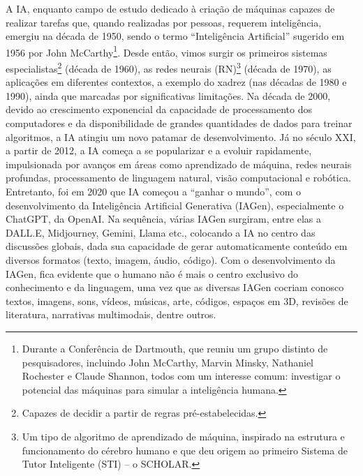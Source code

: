 \documentclass[portuguese]{textolivre}
\begin{document}
A IA, enquanto campo de estudo dedicado à criação de máquinas capazes de realizar tarefas que, quando realizadas por pessoas, requerem inteligência, emergiu na década de 1950, sendo o termo “Inteligência Artificial” sugerido em 1956 por John McCarthy\footnote{Durante a Conferência de Dartmouth, que reuniu um grupo distinto de pesquisadores, incluindo John McCarthy, Marvin Minsky, Nathaniel Rochester e Claude Shannon, todos com um interesse comum: investigar o potencial das máquinas para simular a inteligência humana.}. Desde então, vimos surgir os primeiros sistemas especialistas\footnote{Capazes de decidir a partir de regras pré-estabelecidas.} (década de 1960), as redes neurais (RN)\footnote{Um tipo de algoritmo de aprendizado de máquina, inspirado na estrutura e funcionamento do cérebro humano e que deu origem ao primeiro Sistema de Tutor Inteligente (STI) – o SCHOLAR.} (década de 1970), as aplicações em diferentes contextos, a exemplo do xadrez (nas décadas de 1980 e 1990), ainda que marcadas por significativas limitações. Na década de 2000, devido ao crescimento exponencial da capacidade de processamento dos computadores e da disponibilidade de grandes quantidades de dados para treinar algoritmos, a IA atingiu um novo patamar de desenvolvimento. Já no século XXI, a partir de 2012, a IA começa a se popularizar e a evoluir rapidamente, impulsionada por avanços em áreas como aprendizado de máquina, redes neurais profundas, processamento de linguagem natural, visão computacional e robótica. Entretanto, foi em 2020 que IA começou a “ganhar o mundo”, com o desenvolvimento da Inteligência Artificial Generativa (IAGen), especialmente o ChatGPT, da OpenAI. Na sequência, várias IAGen surgiram, entre elas a DALL.E, Midjourney, Gemini, Llama etc., colocando a IA no centro das discussões globais, dada sua capacidade de gerar automaticamente conteúdo em diversos formatos (texto, imagem, áudio, código). Com o desenvolvimento da IAGen, fica evidente que o humano não é mais o centro exclusivo do conhecimento e da linguagem, uma vez que as diversas IAGen cocriam conosco textos, imagens, sons, vídeos, músicas, arte, códigos, espaços em 3D, revisões de literatura, narrativas multimodais, dentre outros.
\end{document}
